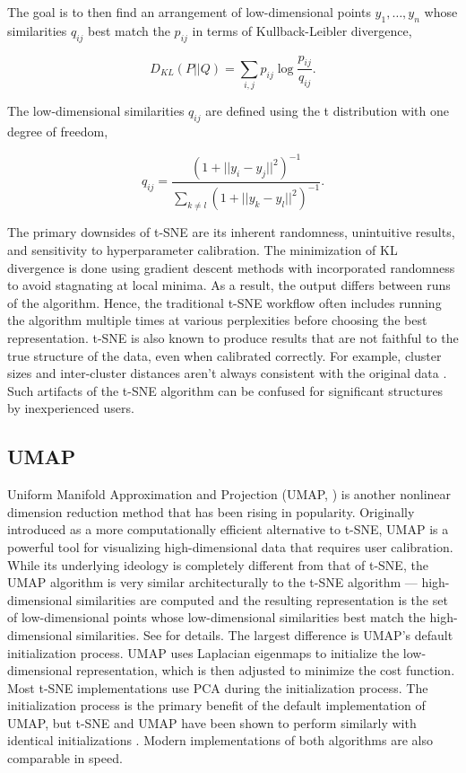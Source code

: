 \documentclass[10pt,letterpaper]{article}
\begin{document}
The goal is to then find an arrangement of low-dimensional points $y_1, \hdots, y_n$ whose similarities $q_{ij}$ best match the $p_{ij}$ in terms of Kullback-Leibler divergence, \begin{linenomath}$$D_{KL}(P || Q) = \sum_{i,j} p_{ij} \log \frac{p_{ij}}{q_{ij}}.$$\end{linenomath} The low-dimensional similarities $q_{ij}$ are defined using the t distribution with one degree of freedom, \begin{linenomath}$$q_{ij} = \frac{(1 + ||y_i - y_j||^2)^{-1}}{ \sum_{k \neq l} (1 + ||y_k - y_l||^2)^{-1}}.$$\end{linenomath}

The primary downsides of t-SNE are its inherent randomness, unintuitive results, and sensitivity to hyperparameter calibration. The minimization of KL divergence is done using gradient descent methods with incorporated randomness to avoid stagnating at local minima. As a result, the output differs between runs of the algorithm. Hence, the traditional t-SNE workflow often includes running the algorithm multiple times at various perplexities before choosing the best representation. t-SNE is also known to produce results that are not faithful to the true structure of the data, even when calibrated correctly. For example, cluster sizes and inter-cluster distances aren't always consistent with the original data \cite{Distill}. Such artifacts of the t-SNE algorithm can be confused for significant structures by inexperienced users.

\subsection*{UMAP}
Uniform Manifold Approximation and Projection (UMAP, \cite{umap}) is another nonlinear dimension reduction method that has been rising in popularity. Originally introduced as a more computationally efficient alternative to t-SNE, UMAP is a powerful tool for visualizing high-dimensional data that requires user calibration. While its underlying ideology is completely different from that of t-SNE, the UMAP algorithm is very similar architecturally to the t-SNE algorithm --- high-dimensional similarities are computed and the resulting representation is the set of low-dimensional points whose low-dimensional similarities best match the high-dimensional similarities. See \cite{umap} for details. The largest difference is UMAP's default initialization process. UMAP uses Laplacian eigenmaps to initialize the low-dimensional representation, which is then adjusted to minimize the cost function. Most t-SNE implementations use PCA during the initialization process. The initialization process is the primary benefit of the default implementation of UMAP, but t-SNE and UMAP have been shown to perform similarly with identical initializations \cite{t-SNE/UMAP example}. Modern implementations of both algorithms are also comparable in speed.
\end{document}
